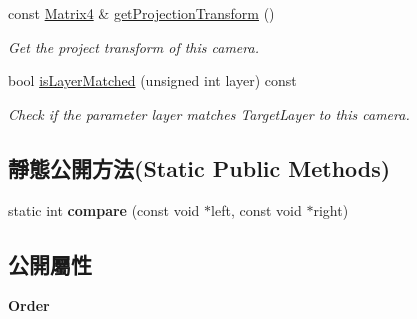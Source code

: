 \begin{DoxyCompactItemize}
const \hyperlink{class_magnum_1_1_matrix4}{Matrix4} \& \hyperlink{class_magnum_1_1_camera_component_aa7d6a7f6379dc17af5eec17fd91843af}{get\+Projection\+Transform} ()
\begin{DoxyCompactList}\small\item\em Get the project transform of this camera. \end{DoxyCompactList}\item 
bool \hyperlink{class_magnum_1_1_camera_component_a38e7ee545e4981d3285df17f89561c24}{is\+Layer\+Matched} (unsigned int layer) const 
\begin{DoxyCompactList}\small\item\em Check if the parameter layer matches Target\+Layer to this camera. \end{DoxyCompactList}\end{DoxyCompactItemize}
\subsection*{靜態公開方法(Static Public Methods)}
\begin{DoxyCompactItemize}
\item 
static int {\bfseries compare} (const void $\ast$left, const void $\ast$right)\hypertarget{class_magnum_1_1_camera_component_a01e3c4027e51ef82206627057d824a18}{}\label{class_magnum_1_1_camera_component_a01e3c4027e51ef82206627057d824a18}

\end{DoxyCompactItemize}
\subsection*{公開屬性}
\begin{DoxyCompactItemize}
\item 
{\bfseries Order}\hypertarget{class_magnum_1_1_camera_component_aef265045d6e85f9d9c39aad419625aaa}{}\label{class_magnum_1_1_camera_component_aef265045d6e85f9d9c39aad419625aaa}

\end{DoxyCompactItemize}

